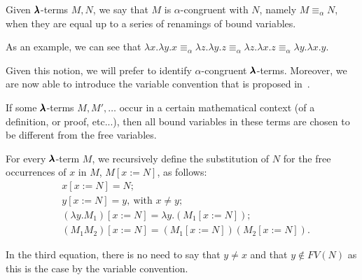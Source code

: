 \begin{definition}
  Given $\pmb{\lambda}$-terms $M, N$, we say that $M$ is $\alpha$-congruent with $N$, namely $M \equiv_\alpha N$, when they are equal up to a series of renamings of bound variables.
\end{definition}
As an example, we can see that 
$\lambda x. \lambda y. x \equiv_\alpha
 \lambda z. \lambda y. z \equiv_\alpha
 \lambda z. \lambda x. z \equiv_\alpha
 \lambda y. \lambda x. y$.

Given this notion, we will prefer to identify $\alpha$-congruent $\pmb{\lambda}$-terms.
Moreover, we are now able to introduce the variable convention that is proposed in~\cite{Barendregt1987}.

\begin{convention} 
  If some $\pmb{\lambda}$-terms $M, M', \dots$ occur in a certain mathematical context (of a definition, or proof, etc...), then all bound variables in these terms are chosen to be different from the free variables. 
\end{convention}

\begin{definition}[Substitution]
  For every $\pmb{\lambda}$-term $M$, we recursively define the substitution of $N$ for the free occurrences of $x$ in $M$, $M[x := N]$, as follows:
  \begin{align*}
    & x[x := N] = N; \\
    & y[x := N] = y, \ \text{with $x \neq y$}; \\
    & (\lambda y . M_1)[x := N] = \lambda y . (M_1[x := N]); \\
    & (M_1 M_2)[x := N] = (M_1[x := N]) (M_2[x := N]).
  \end{align*}
  
  In the third equation, there is no need to say that $y \neq x$ and that $y \not \in FV(N)$ as this is the case by the variable convention.
\end{definition}

\begin{comment}
\begin{remark}
  Is is important to notice that by variable convention, the substitution operation described is capture-avoiding: the free variables in $N$ will not be affected by the binders in $M$, as they are chosen to have different names. 
\end{remark}
\end{comment}

